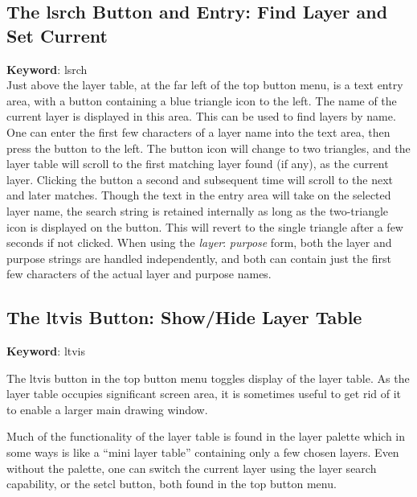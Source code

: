 \subsection{The {\cb lsrch} Button and Entry: Find Layer and Set Current}
\label{lsrch}

{\bf Keyword}: {\vt lsrch}\\

Just above the layer table, at the far left of the top button menu, is
a text entry area, with a button containing a blue triangle icon to
the left.  The name of the current layer is displayed in this area. 
This can be used to find layers by name.  One can enter the first few
characters of a layer name into the text area, then press the button
to the left.  The button icon will change to two triangles, and the
layer table will scroll to the first matching layer found (if any), as
the current layer.  Clicking the button a second and subsequent time
will scroll to the next and later matches.  Though the text in the
entry area will take on the selected layer name, the search string is
retained internally as long as the two-triangle icon is displayed on
the button.  This will revert to the single triangle after a few
seconds if not clicked.  When using the {\it layer\/}{\vt :}{\it
purpose} form, both the layer and purpose strings are handled
independently, and both can contain just the first few characters of
the actual layer and purpose names.

\subsection{The {\cb ltvis} Button: Show/Hide Layer Table}

{\bf Keyword}: {\vt ltvis}

The {\cb ltvis} button in the top button menu toggles display of the
layer table.  As the layer table occupies significant screen area, it
is sometimes useful to get rid of it to enable a larger main drawing
window.

Much of the functionality of the layer table is found in the layer
palette which in some ways is like a ``mini layer table'' containing
only a few chosen layers.  Even without the palette, one can switch
the current layer using the layer search capability, or the {\cb
setcl} button, both found in the top button menu.

